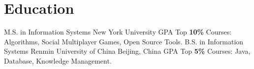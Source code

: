 \documentclass[11pt,a4paper,sans]{moderncv}   %
\begin{document}


\renewcommand{\baselinestretch}{1.25}
\section{Education}

{M.S. in Information Systems}
{New York University}
{}{GPA Top \textbf{10\%}}
{Courses: Algorithms, Social Multiplayer Games, Open Source Tools.}
{B.S. in Information Systems}
{Renmin University of China}
{Beijing, China}
{GPA Top \textbf{5\%}}
{Courses: Java, Database, Knowledge Management.}

\closesection{}                   %
\renewcommand{\listitemsymbol}{-} %
\end{document}
